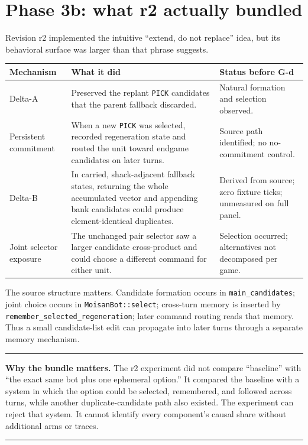 \documentclass[10pt,a4paper]{article}
\newcommand{\code}[1]{\texttt{#1}}
\newenvironment{BlueBox}
  {\par\medskip\noindent\begin{minipage}{\textwidth}\color{accent}\hrule height 1.1pt\vspace{5pt}\color{ink}}
  {\vspace{2pt}\color{accent}\hrule height 1.1pt\end{minipage}\par\medskip}
\begin{document}
\section{Phase 3b: what r2 actually bundled}

Revision r2 implemented the intuitive ``extend, do not replace'' idea, but its behavioral surface
was larger than that phrase suggests.

\begin{tabularx}{\textwidth}{@{}p{27mm}Y p{36mm}@{}}
\toprule
\textbf{Mechanism} & \textbf{What it did} & \textbf{Status before G-d} \\
\midrule
Delta-A & Preserved the replant \code{PICK} candidates that the parent fallback discarded. & Natural formation and selection observed. \\
Persistent commitment & When a new \code{PICK} was selected, recorded regeneration state and routed the unit toward endgame candidates on later turns. & Source path identified; no no-commitment control. \\
Delta-B & In carried, shack-adjacent fallback states, returning the whole accumulated vector and appending bank candidates could produce element-identical duplicates. & Derived from source; zero fixture ticks; unmeasured on full panel. \\
Joint selector exposure & The unchanged pair selector saw a larger candidate cross-product and could choose a different command for either unit. & Selection occurred; alternatives not decomposed per game. \\
\bottomrule
\end{tabularx}

The source structure matters. Candidate formation occurs in \code{main\_candidates}; joint choice
occurs in \code{MoisanBot::select}; cross-turn memory is inserted by
\code{remember\_selected\_regeneration}; later command routing reads that memory. Thus a small
candidate-list edit can propagate into later turns through a separate memory mechanism.

\begin{BlueBox}
\textbf{Why the bundle matters.} The r2 experiment did not compare ``baseline'' with ``the exact
same bot plus one ephemeral option.'' It compared the baseline with a system in which the option
could be selected, remembered, and followed across turns, while another duplicate-candidate path
also existed. The experiment can reject that system. It cannot identify every component's causal
share without additional arms or traces.
\end{BlueBox}
\end{document}
